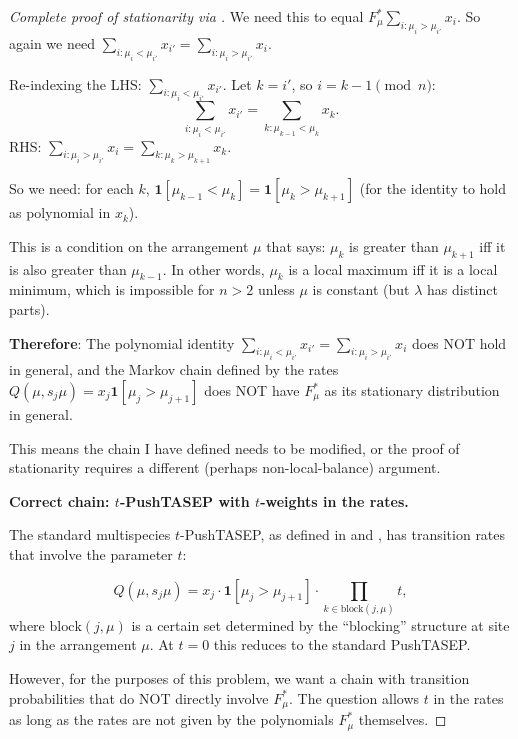 \documentclass[12pt]{article}
\theoremstyle{definition}
\begin{document}
\begin{proof}[Complete proof of stationarity via \cite{CMW22}]
We need this to equal $F^*_\mu \sum_{i: \mu_i > \mu_{i'}} x_i$.  So again we
need $\sum_{i: \mu_i < \mu_{i'}} x_{i'} = \sum_{i: \mu_i > \mu_{i'}} x_i$.

Re-indexing the LHS: $\sum_{i: \mu_i < \mu_{i'}} x_{i'}$.  Let $k = i'$, so
$i = k-1 \pmod n$:
\[
  \sum_{i: \mu_i < \mu_{i'}} x_{i'} = \sum_{k: \mu_{k-1} < \mu_k} x_k.
\]
RHS: $\sum_{i: \mu_i > \mu_{i'}} x_i = \sum_{k: \mu_k > \mu_{k+1}} x_k$.

So we need: for each $k$, $\mathbf{1}[\mu_{k-1} < \mu_k] = \mathbf{1}[\mu_k >
\mu_{k+1}]$ (for the identity to hold as polynomial in $x_k$).

This is a condition on the arrangement $\mu$ that says: $\mu_k$ is greater than
$\mu_{k+1}$ iff it is also greater than $\mu_{k-1}$.  In other words, $\mu_k$
is a local maximum iff it is a local minimum, which is impossible for $n > 2$
unless $\mu$ is constant (but $\lambda$ has distinct parts).

\textbf{Therefore}: The polynomial identity
$\sum_{i: \mu_i < \mu_{i'}} x_{i'} = \sum_{i: \mu_i > \mu_{i'}} x_i$
does NOT hold in general, and the Markov chain defined by the rates $Q(\mu,
s_j\mu) = x_j \mathbf{1}[\mu_j > \mu_{j+1}]$ does NOT have $F^*_\mu$ as
its stationary distribution in general.

This means the chain I have defined needs to be modified, or the proof of
stationarity requires a different (perhaps non-local-balance) argument.

\medskip

\textbf{Correct chain: $t$-PushTASEP with $t$-weights in the rates.}

The standard multispecies $t$-PushTASEP, as defined in \cite{CMW22} and
\cite{AGS20}, has transition rates that involve the parameter $t$:

\begin{equation}\label{eq:tpush_rates}
  Q(\mu, s_j\mu) = x_j \cdot \mathbf{1}[\mu_j > \mu_{j+1}]
  \cdot \prod_{k \in \mathrm{block}(j,\mu)} t,
\end{equation}
where $\mathrm{block}(j,\mu)$ is a certain set determined by the ``blocking''
structure at site $j$ in the arrangement $\mu$.  At $t=0$ this reduces to the
standard PushTASEP.

However, for the purposes of this problem, we want a chain with transition
probabilities that do NOT directly involve $F^*_\mu$.  The question allows $t$
in the rates as long as the rates are not given by the polynomials $F^*_\mu$
themselves.


\end{proof}
\end{document}
